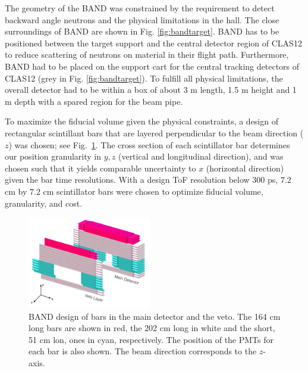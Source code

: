 \documentclass[3p,final,twocolumn]{elsarticle}
\begin{document}
The geometry of the BAND was constrained by the requirement to detect backward angle neutrons and the physical limitations in the hall. 
The close surroundings of BAND are shown in Fig. \ref{fig:bandtarget}. BAND has to be positioned between the target support and the central detector region of CLAS12 to reduce scattering of neutrons on material in their flight path. Furthermore, BAND had to be placed on the support cart for the central tracking detectors of CLAS12 (grey in Fig. \ref{fig:bandtarget}). 
To fulfill all physical limitations, the overall detector had to be within a box of about 3 \si{\meter} length, 1.5 \si{\meter} height and 1 \si{\meter} depth with a spared region for the beam pipe.

To maximize the fiducial volume given the physical constraints, a design of rectangular scintillant bars that are layered perpendicular to the beam direction ($z$) was chosen; see Fig.~\ref{fig:design}.
The cross section of each scintillator bar determines our position granularity in $y,z$ (vertical and longitudinal direction), and was chosen such that it yields comparable uncertainty to $x$ (horizontal direction) given the bar 
time resolutions. With a design ToF resolution below $300$ \si{\pico\second}, $7.2$ \si{\centi\meter} by $7.2$ \si{\centi\meter} scintillator bars were chosen to optimize
fiducial volume, granularity, and cost. 

\begin{figure}[tb]
	\centering
			\includegraphics[width=0.48\textwidth]{band-schematic.pdf}
		\caption{BAND design	of bars in the main detector and the veto. The 164 \si{\centi\meter} long bars are shown in red, the 202 \si{\centi\meter} long in white and the short, 51 \si{\centi\meter} lon, ones in cyan, respectively. The position of the PMTs for each bar is also shown. The beam direction corresponds to the $z$-axis.  }
		\label{fig:design}
\end{figure}
\end{document}
